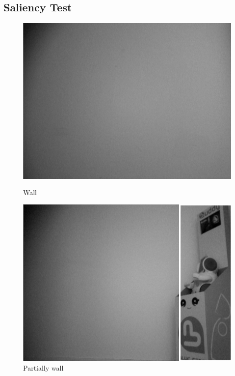 \documentclass[a4paper]{scrartcl}
\begin{document}
\subsection{Saliency Test}
\begin{figure}[H]
\centering
\begin{minipage}{0.33\textwidth}
  \centering
  \includegraphics[width=0.9\linewidth]{img/walldetect.png}
  \caption{Wall}
  \label{suptrain}
\end{minipage}%
\begin{minipage}{0.33\textwidth}
  \centering
  \includegraphics[width=0.9\linewidth]{img/saliency.png}
  \caption{Partially wall}
  \label{states_sup}
\end{minipage}
\begin{minipage}{0.33\textwidth}
  \centering

\end{minipage}
\end{figure}
\end{document}

